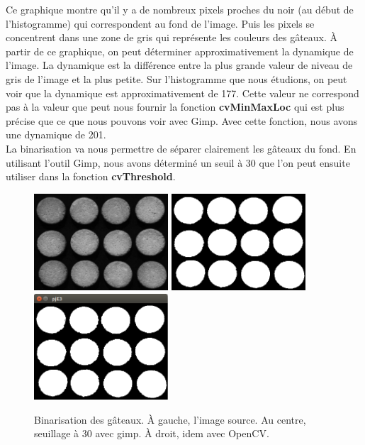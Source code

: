 Ce graphique montre qu'il y a de nombreux pixels proches du noir (au début de l'histogramme) qui correspondent au fond de l'image.
Puis les pixels se concentrent dans une zone de gris qui représente les couleurs des gâteaux. À partir de ce graphique,
on peut déterminer approximativement la dynamique de l'image. La dynamique est la différence entre la plus grande valeur 
de niveau de gris de l'image et la plus petite. Sur l'histogramme que nous étudions, on peut voir que la dynamique est approximativement de 
177. Cette valeur ne correspond pas à la valeur que peut nous fournir la fonction \textbf{cvMinMaxLoc} qui est plus précise 
que ce que nous pouvons voir avec Gimp. Avec cette fonction, nous avons une dynamique de 201.\\

La binarisation va nous permettre de séparer clairement les gâteaux du fond. En utilisant l'outil Gimp, nous avons 
déterminé un seuil à 30 que l'on peut ensuite utiliser dans la fonction \textbf{cvThreshold}.\\

\begin{figure}[H]
      \center
      \includegraphics[width=5cm]{ressources/tp3/gateaux1.png}
      \includegraphics[width=5cm]{ressources/tp3/gateaux1_bin_gimp_T.png}
      \includegraphics[width=5cm]{ressources/tp3/binarization_opencv.png}
      \caption{Binarisation des gâteaux. À gauche, l'image source. Au centre, seuillage à 30 avec gimp. À droit, idem avec OpenCV.}
\end{figure}

